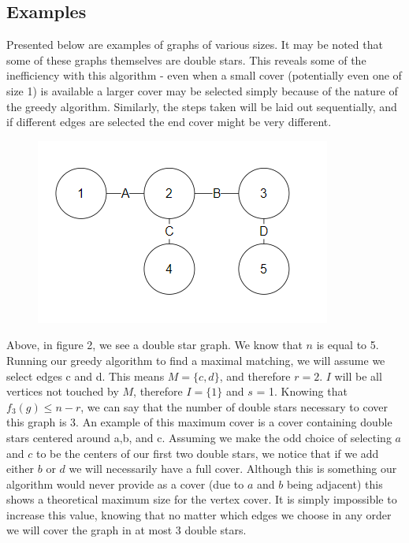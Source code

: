 \documentclass{article}
\begin{document}
		\subsection{Examples}
		Presented below are examples of graphs of various sizes. It may be noted that some of these graphs themselves are double stars. This reveals some of the inefficiency with this algorithm - even when a small cover (potentially even one of size 1) is available a larger cover may be selected simply because of the nature of the greedy algorithm. Similarly, the steps taken will be laid out sequentially, and if different edges are selected the end cover might be very different.
		 \\
				\begin{figure}[H]
				\caption{}
				\includegraphics{Figure2}
			\end{figure}
			Above, in figure 2, we see a double star graph. We know that $n$ is equal to 5. Running our greedy algorithm to find a maximal matching, we will assume we select edges c and d. This means $M = \{c,d\}$, and therefore $r = 2$. $I$ will be all vertices not touched by $M$, therefore $I = \{1\}$ and $s$ = 1. Knowing that $f_{3}(g) \leq n-r$, we can say that the  number of double stars necessary to cover this graph is 3. An example of this maximum cover is a cover containing double stars centered around a,b, and c. Assuming we make the odd choice of selecting $a$ and $c$ to be the centers of our first two double stars, we notice that if we add either $b$ or $d$ we will necessarily have a full cover. Although this is something our algorithm would never provide as a cover (due to $a$ and $b$ being adjacent) this shows a theoretical maximum size for the vertex cover. It is simply impossible to increase this value, knowing that no matter which edges we choose in any order we will cover the graph in at most 3 double stars.
			
\end{document}
